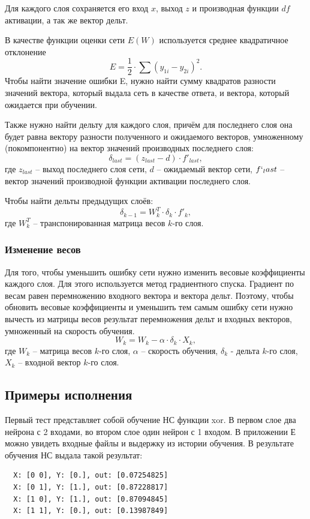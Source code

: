\documentclass[bachelor, och, pract_otchet]{SCWorks}
\begin{document}
Для каждого слоя сохраняется его вход $x$, выход $z$ и производная функции $df$ активации, а
так же вектор дельт.

В качестве функции оценки сети $E(W)$ используется среднее квадратичное отклонение
\[ E = \frac{1}{2} \cdot \sum(y_{1i} - y_{2i})^2. \]
Чтобы найти значение ошибки E, нужно найти сумму квадратов разности значений вектора, 
который выдала сеть в качестве ответа, и вектора, который ожидается при обучении. 

Также нужно найти дельту для каждого слоя, 
причём для последнего слоя она будет равна вектору разности
полученного и ожидаемого векторов, умноженному (покомпонентно) 
на вектор значений производных последнего слоя: 
\[ \delta_{last} = (z_{last} - d) \cdot f'_{last}, \]
где $z_{last}$ -- выход последнего слоя сети, $d$ -- ожидаемый вектор сети,
$f`_last$ -- вектор значений производной функции активации последнего слоя.

Чтобы найти дельты предыдущих слоёв:
\[ \delta_{k - 1} = W_k^T \cdot \delta_k \cdot f'_k, \]
где $W_k^T$ -- транспонированная матрица весов $k$-го слоя.

\subsubsection{Изменение весов}
Для того, чтобы уменьшить ошибку сети нужно изменить весовые коэффициенты каждого слоя.
Для этого используется метод градиентного спуска.
Градиент по весам равен перемножению входного вектора и вектора дельт.
Поэтому, чтобы обновить весовые коэффициенты и уменьшить тем самым ошибку
сети нужно вычесть из матрицы весов результат перемножения дельт и входных векторов, 
умноженный на скорость обучения.
\[ W_{k} = W_k - \alpha \cdot \delta_k \cdot X_k, \]
где $W_k$ -- матрица весов $k$-го слоя, $\alpha$ -- скорость обучения, 
$\delta_k$ - дельта $k$-го слоя, $X_k$ -- входной вектор $k$-го слоя.

\subsection{Примеры исполнения}
Первый тест представляет собой обучение НС функции xor. 
В первом слое два нейрона с 2 входами, во втором слое один нейрон с 1 входом.
В приложении Е можно увидеть входные файлы и выдержку из истории обучения.
В результате обучения НС выдала такой результат:
\begin{verbatim}
  X: [0 0], Y: [0.], out: [0.07254825]
  X: [0 1], Y: [1.], out: [0.87228817]
  X: [1 0], Y: [1.], out: [0.87094845]
  X: [1 1], Y: [0.], out: [0.13987849]
\end{verbatim}
\end{document}
